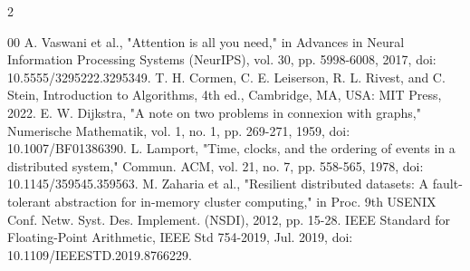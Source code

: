 \documentclass{article}
\begin{document}
\begin{multicols}{2}
\begin{thebibliography}{00}
A. Vaswani et al., "Attention is all you need," in Advances in Neural Information Processing Systems (NeurIPS), vol. 30, pp. 5998-6008, 2017, doi: 10.5555/3295222.3295349.
T. H. Cormen, C. E. Leiserson, R. L. Rivest, and C. Stein, Introduction to Algorithms, 4th ed., Cambridge, MA, USA: MIT Press, 2022.
E. W. Dijkstra, "A note on two problems in connexion with graphs," Numerische Mathematik, vol. 1, no. 1, pp. 269-271, 1959, doi: 10.1007/BF01386390.
L. Lamport, "Time, clocks, and the ordering of events in a distributed system," Commun. ACM, vol. 21, no. 7, pp. 558-565, 1978, doi: 10.1145/359545.359563.
M. Zaharia et al., "Resilient distributed datasets: A fault-tolerant abstraction for in-memory cluster computing," in Proc. 9th USENIX Conf. Netw. Syst. Des. Implement. (NSDI), 2012, pp. 15-28.
IEEE Standard for Floating-Point Arithmetic, IEEE Std 754-2019, Jul. 2019, doi: 10.1109/IEEESTD.2019.8766229.
\end{thebibliography}

\end{multicols}
\end{document}
